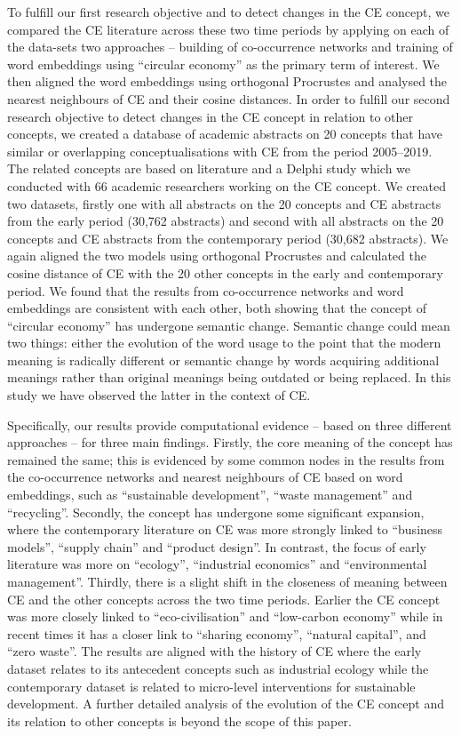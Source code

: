 \documentclass[output=paper]{langsci/langscibook}
\begin{document}
To fulfill our first research objective and to detect changes in the CE concept, we compared the CE literature across these two time periods by applying on each of the data-sets two approaches -- building of co-occurrence networks and training of word embeddings using ``circular economy'' as the primary term of interest. We then aligned the word embeddings using orthogonal Procrustes and analysed the nearest neighbours of CE and their cosine distances. In order to fulfill our second research objective to detect changes in the CE concept in relation to other concepts, we created a database of academic abstracts on 20 concepts that have similar or overlapping conceptualisations with CE from the period 2005--2019. The related concepts are based on literature and a Delphi study which we conducted with 66 academic researchers working on the CE concept. We created two datasets, firstly one with all abstracts on the 20 concepts and CE abstracts from the early period (30,762 abstracts) and second with all abstracts on the 20 concepts and CE abstracts from the contemporary period (30,682 abstracts). We again aligned the two models using orthogonal Procrustes and calculated the cosine distance of CE with the 20 other concepts in the early and contemporary period. 
We found that the results from co-occurrence networks and word embeddings are consistent with each other, both showing that the concept of ``circular economy'' has undergone semantic change. Semantic change could mean two things: either the evolution of the word usage to the point that the modern meaning is radically different or semantic change by words acquiring additional meanings rather than original meanings being outdated or being replaced. In this study we have observed the latter in the context of CE. 

Specifically, our results provide computational evidence -- based on three different approaches -- for three main findings. Firstly, the core meaning of the concept has remained the same; this is evidenced by some common nodes in the results from the co-occurrence networks and nearest neighbours of CE based on word embeddings, such as ``sustainable development'', ``waste management'' and ``recycling''. Secondly, the concept has undergone some significant expansion, where the contemporary literature on CE was more strongly linked to ``business models'', ``supply chain'' and ``product design''. In contrast, the focus of early literature was more on ``ecology'', ``industrial economics'' and ``environmental management''. Thirdly, there is a slight shift in the closeness of meaning between CE and the other concepts across the two time periods. Earlier the CE concept was more closely linked to ``eco-civilisation'' and ``low-carbon economy'' while in recent times it has a closer link to ``sharing economy'', ``natural capital'', and ``zero waste''. The results are aligned with the history of CE where the early dataset relates to its antecedent concepts such as industrial ecology while the contemporary dataset is related to micro-level interventions for sustainable development. A further detailed analysis of the evolution of the CE concept and its relation to other concepts is beyond the scope of this paper.
\end{document}
